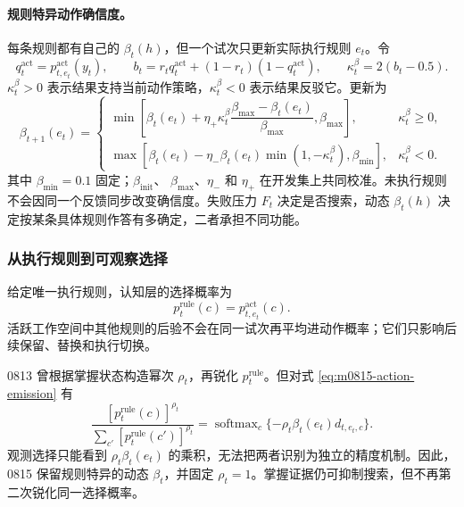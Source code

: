 \paragraph{规则特异动作确信度。}
每条规则都有自己的 $\beta_t(h)$，但一个试次只更新实际执行规则 $e_t$。令
\begin{equation}
q_t^{\mathrm{act}}
=p^{\mathrm{act}}_{t,e_t}(y_t),
\qquad
b_t=r_tq_t^{\mathrm{act}}+(1-r_t)(1-q_t^{\mathrm{act}}),
\qquad
\kappa_t^{\beta}=2(b_t-0.5).
\label{eq:m0815-beta-evidence}
\end{equation}
$\kappa_t^{\beta}>0$ 表示结果支持当前动作策略，$\kappa_t^{\beta}<0$ 表示结果反驳它。更新为
\begin{equation}
\beta_{t+1}(e_t)=
\begin{cases}
\min\!\left[
\beta_t(e_t)+\eta_+\kappa_t^{\beta}
\dfrac{\beta_{\max}-\beta_t(e_t)}{\beta_{\max}},
\beta_{\max}\right],
&\kappa_t^{\beta}\geq0,
\\[7pt]
\max\!\left[
\beta_t(e_t)-\eta_-\beta_t(e_t)
\min(1,-\kappa_t^{\beta}),
\beta_{\min}\right],
&\kappa_t^{\beta}<0.
\end{cases}
\label{eq:m0815-beta-update}
\end{equation}
其中 $\beta_{\min}=0.1$ 固定；$\beta_{\mathrm{init}}$、
$\beta_{\max}$、$\eta_-$ 和 $\eta_+$ 在开发集上共同校准。未执行规则不会因同一个反馈同步改变确信度。失败压力 $F_t$ 决定是否搜索，动态 $\beta_t(h)$ 决定按某条具体规则作答有多确定，二者承担不同功能。


\subsubsection{从执行规则到可观察选择}

给定唯一执行规则，认知层的选择概率为
\begin{equation}
p_t^{\mathrm{rule}}(c)=p^{\mathrm{act}}_{t,e_t}(c).
\label{eq:m0815-executed-choice}
\end{equation}
活跃工作空间中其他规则的后验不会在同一试次再平均进动作概率；它们只影响后续保留、替换和执行切换。

0813 曾根据掌握状态构造幂次 $\rho_t$，再锐化
$p_t^{\mathrm{rule}}$。但对式 \ref{eq:m0815-action-emission} 有
\begin{equation}
\frac{[p_t^{\mathrm{rule}}(c)]^{\rho_t}}
{\sum_{c'}[p_t^{\mathrm{rule}}(c')]^{\rho_t}}
=\operatorname{softmax}_{c}
\{-\rho_t\beta_t(e_t)d_{t,e_t,c}\}.
\label{eq:m0815-redundant-precision}
\end{equation}
观测选择只能看到 $\rho_t\beta_t(e_t)$ 的乘积，无法把两者识别为独立的精度机制。因此，0815 保留规则特异的动态 $\beta_t$，并固定 $\rho_t=1$。掌握证据仍可抑制搜索，但不再第二次锐化同一选择概率。

